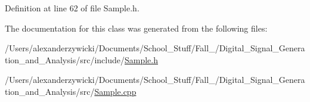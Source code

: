 Definition at line 62 of file Sample.\+h.



The documentation for this class was generated from the following files\+:\begin{DoxyCompactItemize}
\item 
/\+Users/alexanderzywicki/\+Documents/\+School\+\_\+\+Stuff/\+Fall\+\_/\+Digital\+\_\+\+Signal\+\_\+\+Generation\+\_\+and\+\_\+\+Analysis/src/include/\hyperlink{Sample_8h}{Sample.\+h}\item 
/\+Users/alexanderzywicki/\+Documents/\+School\+\_\+\+Stuff/\+Fall\+\_/\+Digital\+\_\+\+Signal\+\_\+\+Generation\+\_\+and\+\_\+\+Analysis/src/\hyperlink{Sample_8cpp}{Sample.\+cpp}\end{DoxyCompactItemize}
